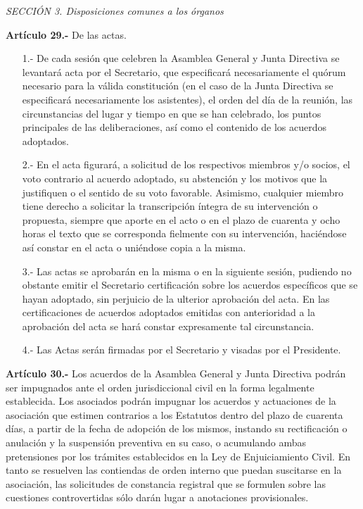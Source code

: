 \documentclass[a4paper,12pt]{article}
\begin{document}
\begin{onehalfspace}
\bigskip\bigskip

\textit{SECCI\'ON 3\textordfeminine. Disposiciones comunes a los \'organos}

\bigskip\bigskip

\textbf{Art\'iculo 29.-} De las actas.
\begin{itemize}
\item [1.-] De cada sesi\'on que celebren la Asamblea General y Junta Directiva   se   levantar\'a    acta   por el Secretario,  que  especificar\'a necesariamente el qu\'orum necesario para la v\'alida constituci\'on (en el caso de la Junta Directiva se especificar\'a necesariamente los asistentes), el orden del d\'ia de la reuni\'on, las circunstancias del lugar y tiempo en que se han celebrado, los puntos principales de las deliberaciones, as\'i como el contenido de los acuerdos adoptados.
\item [2.-] En el acta figurar\'a, a solicitud de los respectivos miembros y/o socios, el voto contrario al acuerdo adoptado, su abstenci\'on y los motivos que la justifiquen o el sentido de su voto favorable. Asimismo, cualquier miembro tiene derecho a solicitar la transcripci\'on \'integra de su intervenci\'on o propuesta, siempre que aporte en el acto o en el plazo de cuarenta y ocho horas el texto que se corresponda fielmente con su intervenci\'on, haci\'endose as\'i constar en el acta o uni\'endose copia a la misma.
\item [3.-] Las actas se aprobar\'an en la misma o en la siguiente sesi\'on, pudiendo no obstante emitir el Secretario certificaci\'on sobre los acuerdos espec\'ificos que se hayan adoptado, sin perjuicio de la ulterior aprobaci\'on del acta. En las certificaciones de acuerdos adoptados emitidas con anterioridad a la aprobaci\'on del acta se har\'a constar expresamente tal circunstancia.
\item [4.-] Las Actas ser\'an firmadas por el Secretario y visadas por el Presidente.
\end{itemize}

\bigskip\bigskip

\textbf{Art\'iculo 30.-} Los acuerdos de la Asamblea General y Junta Directiva podr\'an ser impugnados ante el orden jurisdiccional civil en la forma legalmente establecida. Los asociados podr\'an impugnar los acuerdos y actuaciones de la asociaci\'on que estimen contrarios a los Estatutos dentro del plazo de cuarenta d\'ias, a partir de la fecha de adopci\'on de los mismos, instando su rectificaci\'on o anulaci\'on y la suspensi\'on preventiva en su caso, o acumulando ambas pretensiones por los tr\'amites establecidos en la Ley de Enjuiciamiento Civil. En tanto se resuelven las contiendas de orden interno que puedan suscitarse en la asociaci\'on, las solicitudes de constancia registral que se formulen sobre las cuestiones controvertidas s\'olo dar\'an lugar a anotaciones provisionales.


\end{onehalfspace}
\end{document}
